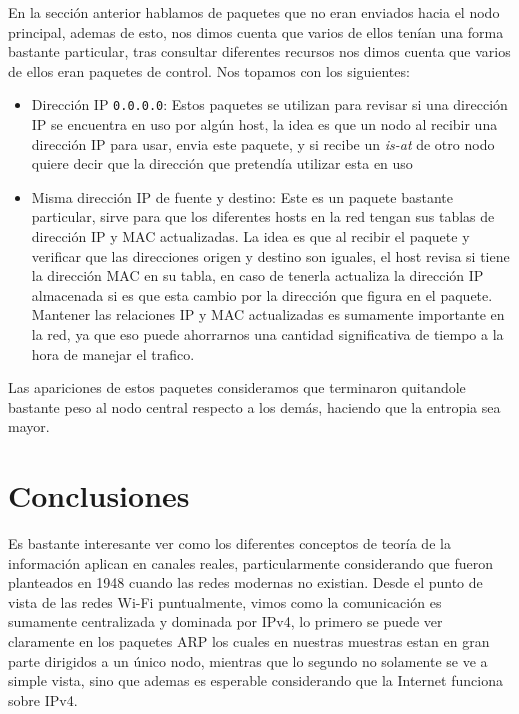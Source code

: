 En la sección anterior hablamos de paquetes que no eran enviados hacia el nodo principal, ademas de esto, nos dimos cuenta que varios de ellos tenían una forma bastante particular, tras consultar diferentes recursos nos dimos cuenta que varios de ellos eran paquetes de control. Nos topamos con los siguientes:

\begin{itemize}
	\item Dirección IP \texttt{0.0.0.0}: Estos paquetes se utilizan para revisar si una dirección IP se encuentra en uso por algún host, la idea es que un nodo al recibir una dirección IP para usar, envia este paquete, y si recibe un \textit{is-at} de otro nodo quiere decir que la dirección que pretendía utilizar esta en uso
	\item Misma dirección IP de fuente y destino: Este es un paquete bastante particular, sirve para que los diferentes hosts en la red tengan sus tablas de dirección IP y MAC actualizadas. La idea es que al recibir el paquete y verificar que las direcciones origen y destino son iguales, el host revisa si tiene la dirección MAC en su tabla, en caso de tenerla actualiza la dirección IP almacenada si es que esta cambio por la dirección que figura en el paquete. Mantener las relaciones IP y MAC actualizadas es sumamente importante en la red, ya que eso puede ahorrarnos una cantidad significativa de tiempo a la hora de manejar el trafico.
\end{itemize}

Las apariciones de estos paquetes consideramos que terminaron quitandole bastante peso al nodo central respecto a los demás, haciendo que la entropia sea mayor.

\section{Conclusiones}

Es bastante interesante ver como los diferentes conceptos de teoría de la información aplican en canales reales, particularmente considerando que fueron planteados en 1948 cuando las redes modernas no existian. Desde el punto de vista de las redes Wi-Fi puntualmente, vimos como la comunicación es sumamente centralizada y dominada por IPv4, lo primero se puede ver claramente en los paquetes ARP los cuales en nuestras muestras estan en gran parte dirigidos a un único nodo, mientras que lo segundo no solamente se ve a simple vista, sino que ademas es esperable considerando que la Internet funciona sobre IPv4.

